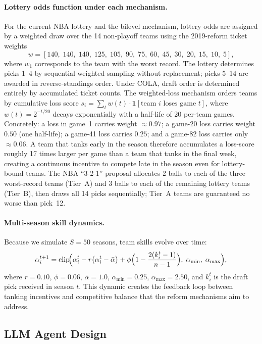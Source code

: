 \documentclass{article}
\begin{document}
\paragraph{Lottery odds function under each mechanism.}
For the current NBA lottery and the bilevel mechanism, lottery odds are
assigned by a weighted draw over the 14 non-playoff teams using the
2019-reform ticket weights
\[
    w = [140,\; 140,\; 140,\; 125,\; 105,\; 90,\; 75,\; 60,\;
         45,\; 30,\; 20,\; 15,\; 10,\; 5],
\]
where $w_1$ corresponds to the team with the worst record.
The lottery determines picks 1--4 by sequential weighted sampling without
replacement; picks 5--14 are awarded in reverse-standings order.
Under COLA, draft order is determined entirely by accumulated ticket counts.
The weighted-loss mechanism orders teams by cumulative loss score
$s_i = \sum_{t} w(t) \cdot \mathbf{1}[\text{team $i$ loses game $t$}]$,
where $w(t) = 2^{-t/20}$ decays exponentially with a half-life of 20
per-team games.
Concretely: a loss in game~1 carries weight $\approx 0.97$; a game-20 loss
carries weight $0.50$ (one half-life); a game-41 loss carries $0.25$; and
a game-82 loss carries only $\approx 0.06$.
A team that tanks early in the season therefore accumulates a loss-score
roughly 17 times larger per game than a team that tanks in the final week,
creating a continuous incentive to compete late in the season even for
lottery-bound teams.
The NBA ``3-2-1'' proposal allocates 2 balls to each of the three worst-record
teams (Tier~A) and 3 balls to each of the remaining lottery teams (Tier~B),
then draws all 14 picks sequentially; Tier~A teams are guaranteed no worse
than pick~12.

\paragraph{Multi-season skill dynamics.}
Because we simulate $S = 50$ seasons, team skills evolve over time:
\[
    \alpha_i^{t+1}
    = \operatorname{clip}\!\Bigl(
        \alpha_i^t
        - r\bigl(\alpha_i^t - \bar{\alpha}\bigr)
        + \phi\Bigl(1 - \frac{2(k_i^t - 1)}{n - 1}\Bigr),\;
        \alpha_{\min},\; \alpha_{\max}
      \Bigr),
\]
where $r = 0.10$, $\phi = 0.06$, $\bar{\alpha} = 1.0$,
$\alpha_{\min} = 0.25$, $\alpha_{\max} = 2.50$, and $k_i^t$ is the draft
pick received in season $t$.
This dynamic creates the feedback loop between tanking incentives and
competitive balance that the reform mechanisms aim to address.

\subsection{LLM Agent Design}
\end{document}
